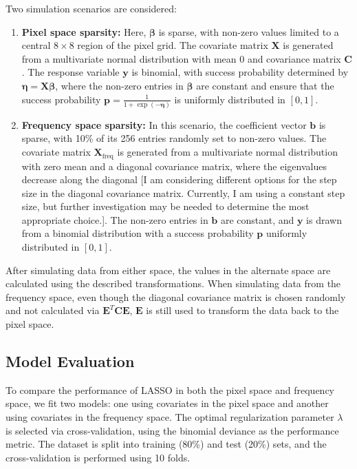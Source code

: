 \documentclass[12pt]{article}
\begin{document}
Two simulation scenarios are considered:
\begin{enumerate}
  \item \textbf{Pixel space sparsity:} Here, \( \boldsymbol{\beta} \) is sparse, with non-zero values limited to a central \( 8 \times 8 \) region of the pixel grid. The covariate matrix \( \mathbf{X} \) is generated from a multivariate normal distribution with mean 0 and covariance matrix \( \mathbf{C} \). The response variable \( \mathbf{y} \) is binomial, with success probability determined by \( \boldsymbol{\eta} = \mathbf{X} \boldsymbol{\beta} \), where the non-zero entries in \( \boldsymbol{\beta} \) are constant and ensure that the success probability \( \mathbf{p} = \frac{1}{1 + \exp(-\boldsymbol{\eta})} \) is uniformly distributed in \( [0, 1] \).
  
  \item \textbf{Frequency space sparsity:} In this scenario, the coefficient vector \( \mathbf{b} \) is sparse, with 10\% of its 256 entries randomly set to non-zero values. The covariate matrix \( \mathbf{X}_{\mathrm{freq}} \) is generated from a multivariate normal distribution with zero mean and a diagonal covariance matrix, where the eigenvalues decrease along the diagonal [I am considering different options for the step size in the diagonal covariance matrix. Currently, I am using a constant step size, but further investigation may be needed to determine the most appropriate choice.]. The non-zero entries in \( \mathbf{b} \) are constant, and \( \mathbf{y} \) is drawn from a binomial distribution with a success probability \( \mathbf{p} \) uniformly distributed in \( [0, 1] \).

\end{enumerate}

After simulating data from either space, the values in the alternate space are calculated using the described transformations. When simulating data from the frequency space, even though the diagonal covariance matrix is chosen randomly and not calculated via \( \mathbf{E}^T \mathbf{C} \mathbf{E} \), \( \mathbf{E} \) is still used to transform the data back to the pixel space.

\subsection*{Model Evaluation}

To compare the performance of LASSO in both the pixel space and frequency space, we fit two models: one using covariates in the pixel space and another using covariates in the frequency space. The optimal regularization parameter \( \lambda \) is selected via cross-validation, using the binomial deviance as the performance metric. The dataset is split into training (80\%) and test (20\%) sets, and the cross-validation is performed using 10 folds.
\end{document}
